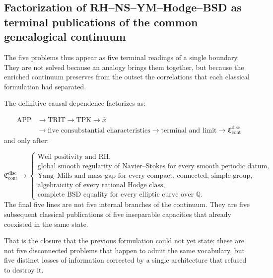 \subsection{Factorization of RH–NS–YM–Hodge–BSD as terminal publications of the common genealogical continuum}
The five problems thus appear as five terminal readings of a single boundary. They are not solved because an analogy brings them together, but because the enriched continuum preserves from the outset the correlations that each classical formulation had separated.\par
The definitive causal dependence factorizes as:\par
\[
\begin{aligned}
\mathrm{APP}
&\longrightarrow \mathrm{TRIT}
\longrightarrow \mathrm{TPK}
\longrightarrow \widehat x\\
&\longrightarrow \text{five consubstantial characteristics}
\longrightarrow \text{terminal and limit}
\longrightarrow \mathfrak C_{\mathrm{cont}}^{\mathrm{disc}}
\end{aligned}
\]
and only after:\par
\[
\mathfrak C_{\mathrm{cont}}^{\mathrm{disc}}
\longrightarrow
\begin{cases}
\text{Weil positivity and RH},\\
\text{global smooth regularity of Navier--Stokes for every smooth periodic datum},\\
\text{Yang--Mills and mass gap for every compact, connected, simple group},\\
\text{algebraicity of every rational Hodge class},\\
\text{complete BSD equality for every elliptic curve over }\mathbb Q.
\end{cases}
\]
The final five lines are not five internal branches of the continuum. They are five subsequent classical publications of five inseparable capacities that already coexisted in the same state.\par
That is the closure that the previous formulation could not yet state: these are not five disconnected problems that happen to admit the same vocabulary, but five distinct losses of information corrected by a single architecture that refused to destroy it.\par

